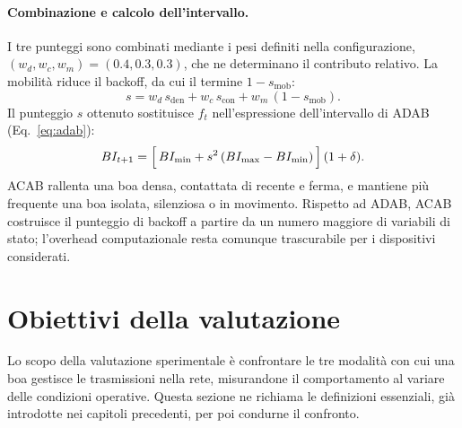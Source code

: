 \paragraph{Combinazione e calcolo dell'intervallo.} I tre punteggi sono
combinati mediante i pesi definiti nella configurazione,
$(w_d,w_c,w_m)=(0.4,0.3,0.3)$, che ne determinano il contributo relativo. La
mobilit\`a riduce il backoff, da cui il termine $1-s_{\mathrm{mob}}$:
\begin{equation}
  s = w_d\,s_{\mathrm{den}} + w_c\,s_{\mathrm{con}} + w_m\,(1 - s_{\mathrm{mob}}).
  \label{eq:acab-blend}
\end{equation}
Il punteggio $s$ ottenuto sostituisce $f_t$ nell'espressione dell'intervallo di ADAB
(Eq.~\ref{eq:adab}): 
\begin{equation}
  BI_{t+1} = \Big[\,BI_{\min} + s^{2}\,(BI_{\max}-BI_{\min})\,\Big]\,(1+\delta).
  \label{eq:acab}
\end{equation}
ACAB rallenta una boa densa, contattata di recente e
ferma, e mantiene pi\`u frequente una boa isolata, silenziosa o in movimento.
Rispetto ad ADAB, ACAB costruisce il punteggio di
backoff a partire da  un numero maggiore di variabili di stato; 
l'overhead computazionale resta comunque trascurabile per i dispositivi considerati.

\section{Obiettivi della valutazione}
\label{sec:eval-goals}
Lo scopo della valutazione sperimentale è confrontare le tre modalità 
con cui una boa gestisce le trasmissioni nella rete, 
misurandone il comportamento al variare delle condizioni operative.
Questa sezione ne richiama le definizioni essenziali, già introdotte nei capitoli precedenti, 
per poi condurne il confronto.

